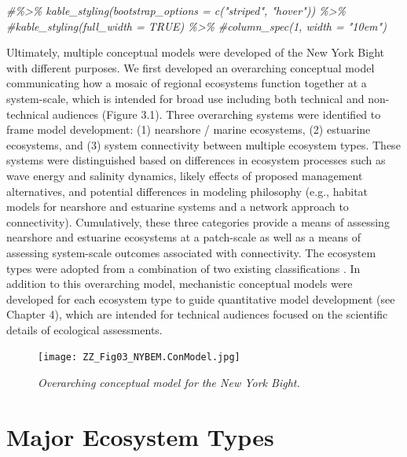 \documentclass[
]{book}
\newenvironment{Shaded}{\begin{snugshade}}{\end{snugshade}}
\newcommand{\CommentTok}[1]{\textcolor[rgb]{0.56,0.35,0.01}{\textit{#1}}}
\begin{document}
\begin{Shaded}
\begin{Highlighting}[]
\CommentTok{\#\%\textgreater{}\%  kable\_styling(bootstrap\_options = c("striped", "hover")) \%\textgreater{}\%}
\CommentTok{\#kable\_styling(full\_width = TRUE) \%\textgreater{}\%}
\CommentTok{\#column\_spec(1, width = "10em")}
\end{Highlighting}
\end{Shaded}

Ultimately, multiple conceptual models were developed of the New York Bight with different purposes. We first developed an overarching conceptual model communicating how a mosaic of regional ecosystems function together at a system-scale, which is intended for broad use including both technical and non-technical audiences (Figure 3.1). Three overarching systems were identified to frame model development: (1) nearshore / marine ecosystems, (2) estuarine ecosystems, and (3) system connectivity between multiple ecosystem types. These systems were distinguished based on differences in ecosystem processes such as wave energy and salinity dynamics, likely effects of proposed management alternatives, and potential differences in modeling philosophy (e.g., habitat models for nearshore and estuarine systems and a network approach to connectivity). Cumulatively, these three categories provide a means of assessing nearshore and estuarine ecosystems at a patch-scale as well as a means of assessing system-scale outcomes associated with connectivity. The ecosystem types were adopted from a combination of two existing classifications \citep{cowardin_classification_1979, us_fish_and_wildlife_service_usfws_significant_1997}. In addition to this overarching model, mechanistic conceptual models were developed for each ecosystem type to guide quantitative model development (see Chapter 4), which are intended for technical audiences focused on the scientific details of ecological assessments.

\begin{figure}
\centering
\texttt{[image: ZZ\_Fig03\_NYBEM.ConModel.jpg]}
\caption{\emph{Overarching conceptual model for the New York Bight.}}
\end{figure}

\hypertarget{major-ecosystem-types}{%
\section{Major Ecosystem Types}\label{major-ecosystem-types}}
\end{document}
